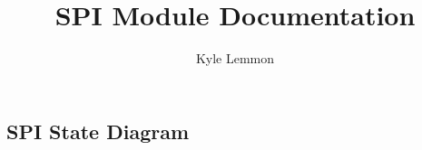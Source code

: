 \documentclass[../../ProjectDocumentation.tex]{subfiles}
\title{\textbf{SPI Module Documentation}}
\author{Kyle Lemmon}
\date{}
\begin{document}
\maketitle

\subsection{SPI State Diagram}

\end{document}
